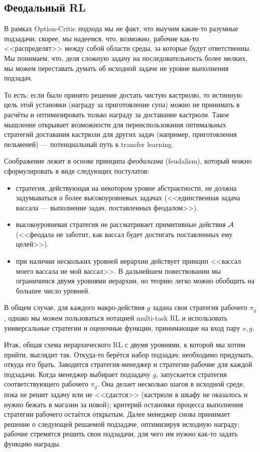 \subsection{Феодальный RL}

В рамках Option-Critic подхода мы не факт, что выучим какие-то разумные подзадачи; скорее, мы надеемся, что, возможно, рабочие как-то <<распределят>> между собой области среды, за которые будут ответственны. Мы понимаем, что, деля сложную задачу на последовательность более мелких, мы можем переставать думать об исходной задаче не уровне выполнения подзадач. 

\begin{example}
То есть: если было принято решение достать чистую кастрюлю, то истинную цель этой установки (награду за приготовление супа) можно не принимать в расчёты и оптимизировать только награду за доставание кастрюли. Такое мышление открывает возможности для переиспользования оптимальных стратегий доставания кастрюли для других задач (например, приготовления пельменей) --- потенциальный путь к transfer learning.
\end{example}

Соображение лежит в основе принципа \emph{феодализма} (feudalism), который можно сформулировать в виде следующих постулатов:
\begin{itemize}
    \item стратегия, действующая на некотором уровне абстрактности, не должна задумываться о более высокоуровневых задачах (<<единственная задача вассала --- выполнение задач, поставленных феодалом>>).
    \item высокоуровневая стратегия не рассматривает примитивные действия $\mathcal{A}$ (<<феодала не заботит, как вассал будет достигать поставленных ему целей>>).
    \item при наличии нескольких уровней иерархии действует принцип <<вассал моего вассала не мой вассал>>. В дальнейшем повествовании мы ограничимся двумя уровнями иерархии, но теорию легко можно обобщить на большее число уровней.
\end{itemize}

В общем случае, для каждого макро-действия $g$ задана своя стратегия рабочего $\pi_g$, однако мы можем пользоваться нотацией multi-task RL и использовать универсальные стратегии и оценочные функции, принимающие на вход пару $s, g$.

Итак, общая схема иерархического RL с двумя уровнями, к которой мы хотим прийти, выглядит так. Откуда-то берётся набор подзадач; необходимо придумать, откуда его брать. Заводится стратегия-менеджер и стратегии-рабочие для каждой подзадачи. Когда менеджер выбирает подзадачу $g$, запускается стратегия соответствующего рабочего $\pi_g$. Она делает несколько шагов в исходной среде, пока не решит задачу или не <<сдастся>> (кастрюли в шкафу не оказалось и нужно бежать в магазин за новой); критерий остановки процесса выполнения стратегии рабочего остаётся открытым. Далее менеджер снова принимает решение о следующей решаемой подзадаче, оптимизируя исходную награду; рабочие стремятся решить свои подзадачи, для чего им нужно как-то задать функцию награды. 

